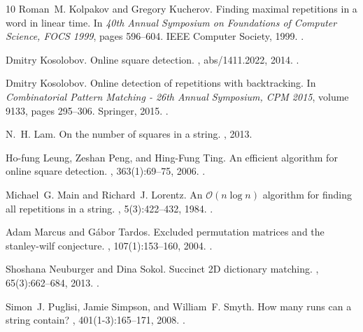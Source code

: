 \documentclass[11pt,letterpaper]{article}
\begin{document}
\begin{thebibliography}{10}
Roman~M. Kolpakov and Gregory Kucherov.
\newblock Finding maximal repetitions in a word in linear time.
\newblock In {\em 40th Annual Symposium on Foundations of Computer Science,
  {FOCS} 1999}, pages 596--604. {IEEE} Computer Society, 1999.
\newblock \href {https://doi.org/10.1109/SFFCS.1999.814634}
  {}.

Dmitry Kosolobov.
\newblock Online square detection.
, abs/1411.2022, 2014.
\newblock \href {http://arxiv.org/abs/1411.2022} {}.

Dmitry Kosolobov.
\newblock Online detection of repetitions with backtracking.
\newblock In {\em Combinatorial Pattern Matching - 26th Annual Symposium, {CPM}
  2015}, volume 9133, pages 295--306. Springer, 2015.
\newblock \href {https://doi.org/10.1007/978-3-319-19929-0\_25}
  {}.

N.~H. Lam.
\newblock On the number of squares in a string.
, 2013.

Ho{-}fung Leung, Zeshan Peng, and Hing{-}Fung Ting.
\newblock An efficient algorithm for online square detection.
, 363(1):69--75, 2006.
\newblock \href {https://doi.org/10.1016/J.TCS.2006.06.011}
  {}.

Michael~G. Main and Richard~J. Lorentz.
\newblock An $\mathcal{O}(n\log n)$ algorithm for finding all repetitions in a
  string.
, 5(3):422--432, 1984.
\newblock \href {https://doi.org/10.1016/0196-6774(84)90021-X}
  {}.

Adam Marcus and G{\'{a}}bor Tardos.
\newblock Excluded permutation matrices and the stanley-wilf conjecture.
, 107(1):153--160, 2004.
\newblock \href {https://doi.org/10.1016/J.JCTA.2004.04.002}
  {}.

Shoshana Neuburger and Dina Sokol.
\newblock Succinct {2D} dictionary matching.
, 65(3):662--684, 2013.
\newblock \href {https://doi.org/10.1007/S00453-012-9615-9}
  {}.

Simon~J. Puglisi, Jamie Simpson, and William~F. Smyth.
\newblock How many runs can a string contain?
, 401(1-3):165--171, 2008.
\newblock \href {https://doi.org/10.1016/J.TCS.2008.04.020}
  {}.


\end{thebibliography}
\end{document}
